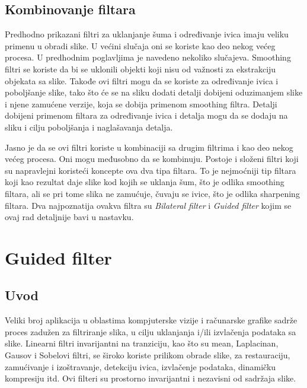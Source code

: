\documentclass[a4paper,12pt,titlepage]{article}
\begin{document}
\subsection{Kombinovanje filtara}%

Predhodno prikazani filtri za uklanjanje šuma i određivanje ivica imaju veliku primenu u obradi slike. U većini slučaja oni se koriste kao deo nekog većeg procesa. U predhodnim poglavljima je navedeno nekoliko slučajeva. Smoothing filtri se koriste da bi se uklonili objekti koji nisu od važnosti za ekstrakciju objekata sa slike. Takođe ovi filtri mogu da se koriste za određivanje ivica i poboljšanje slike, tako što će se na sliku dodati detalji dobijeni oduzimanjem slike i njene zamućene verzije, koja se dobija primenom smoothing filtra. Detalji dobijeni primenom filtara za određivanje ivica i detalja mogu da se dodaju na sliku i cilju poboljšanja i naglašavanja detalja. 

Jasno je da se ovi filtri koriste u kombinaciji sa drugim filtrima i kao deo nekog većeg procesa. Oni mogu međusobno da se kombinuju. Postoje i složeni filtri koji su napravlejni koristeći koncepte ova dva tipa filtara. To je nejmoćniji tip filtara koji kao rezultat daje slike kod kojih se uklanja šum, što je odlika smoothing filtara, ali se pri tome slika ne zamućuje, čuvaju se ivice, što je odlika sharpening filtara. Dva najpoznatija ovakva filtra su \emph{Bilateral filter} i \emph{Guided filter} kojim se ovaj rad detaljnije bavi u nastavku.  

\section{Guided filter}%

\subsection{Uvod}%

Veliki broj aplikacija u oblastima kompjuterske vizije i računarske grafike sadrže proces zadužen za filtriranje slika, u cilju uklanjanja i/ili izvlačenja podataka sa slike. Linearni filtri invarijantni na tranziciju, kao što su mean, Laplacinan, Gausov i Sobelovi filtri, se široko koriste prilikom obrade slike, za restauraciju, zamućivanje i izoštravanje, detekciju ivica, izvlačenje podataka, dinamičku kompresiju itd. Ovi filteri su prostorno invarijantni i nezavisni od sadržaja slike. 
\end{document}
